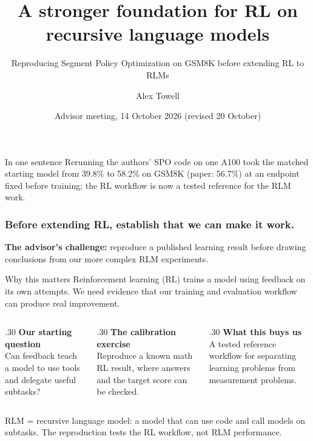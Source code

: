 \documentclass[aspectratio=169,11pt]{beamer}
\title{A stronger foundation for RL on recursive language models}
\subtitle{Reproducing Segment Policy Optimization on GSM8K before extending RL to RLMs}
\author{Alex Towell}
\date{Advisor meeting, 14 October 2026 (revised 20 October)}
\newcommand{\source}[1]{\vfill{\scriptsize\color{Gray}#1\par}}
\begin{document}
\begin{frame}[plain]
\titlepage
\vfill
\begin{block}{In one sentence}
Rerunning the authors' SPO code on one A100 took the matched starting model from 39.8\% to
58.2\% on GSM8K (paper: 56.7\%) at an endpoint fixed before training; the RL workflow is now a
tested reference for the RLM work.
\end{block}
\end{frame}

\begin{frame}[t]
\frametitle{Before extending RL, establish that we can make it work.}
\textbf{The advisor's challenge:} reproduce a published learning result before
drawing conclusions from our more complex RLM experiments.
\medskip
\begin{block}{Why this matters}
Reinforcement learning (RL) trains a model using feedback on its own attempts.
We need evidence that our training and evaluation workflow can produce real improvement.
\end{block}
\medskip
\begin{columns}[T,onlytextwidth]
\begin{column}{.30\textwidth}
\textbf{Our starting question}\\[2mm]
Can feedback teach a model to use tools and delegate useful subtasks?
\end{column}
\begin{column}{.30\textwidth}
\textbf{The calibration exercise}\\[2mm]
Reproduce a known math RL result, where answers and the target score can be checked.
\end{column}
\begin{column}{.30\textwidth}
\textbf{What this buys us}\\[2mm]
A tested reference workflow for separating learning problems from measurement problems.
\end{column}
\end{columns}
\source{RLM = recursive language model: a model that can use code and call models on subtasks. The reproduction tests the RL workflow, not RLM performance.}
\end{frame}
\end{document}
